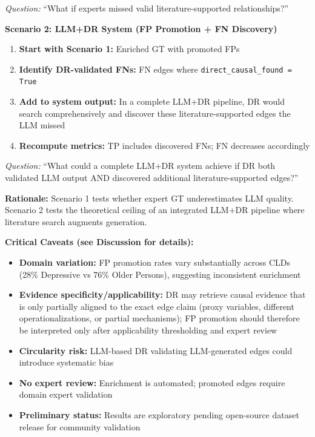 \textit{Question:} ``What if experts missed valid literature-supported relationships?''

\textbf{Scenario 2: LLM+DR System (FP Promotion + FN Discovery)}
\begin{enumerate}[noitemsep]
    \item \textbf{Start with Scenario 1:} Enriched GT with promoted FPs
    \item \textbf{Identify DR-validated FNs:} FN edges where \texttt{direct\_causal\_found = True}
    \item \textbf{Add to system output:} In a complete LLM+DR pipeline, DR would search comprehensively and discover these literature-supported edges the LLM missed
    \item \textbf{Recompute metrics:} TP includes discovered FNs; FN decreases accordingly
\end{enumerate}

\textit{Question:} ``What could a complete LLM+DR system achieve if DR both validated LLM output AND discovered additional literature-supported edges?''

\textbf{Rationale:} Scenario 1 tests whether expert GT underestimates LLM quality. Scenario 2 tests the theoretical ceiling of an integrated LLM+DR pipeline where literature search augments generation.

\textbf{Critical Caveats (see Discussion for details):}
\begin{itemize}[noitemsep]
    \item \textbf{Domain variation:} FP promotion rates vary substantially across CLDs (28\% Depressive vs 76\% Older Persons), suggesting inconsistent enrichment
    \item \textbf{Evidence specificity/applicability:} DR may retrieve causal evidence that is only partially aligned to the exact edge claim (proxy variables, different operationalizations, or partial mechanisms); FP promotion should therefore be interpreted only after applicability thresholding and expert review
    \item \textbf{Circularity risk:} LLM-based DR validating LLM-generated edges could introduce systematic bias
    \item \textbf{No expert review:} Enrichment is automated; promoted edges require domain expert validation
    \item \textbf{Preliminary status:} Results are exploratory pending open-source dataset release for community validation
\end{itemize}


